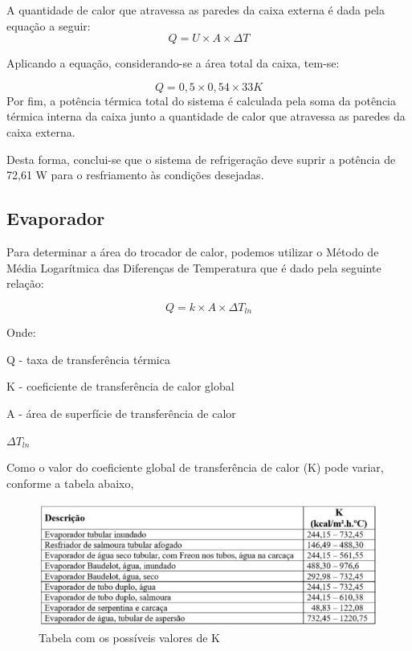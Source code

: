 	A quantidade de calor que atravessa as paredes da caixa externa é dada pela equação a seguir:
	\begin{equation}
	Q = U \times A \times \Delta T
	\end{equation}
	
	Aplicando a equação, considerando-se a área total da caixa, tem-se:
	
	$$
	Q = 0,5 \times 0,54 \times 33K
	$$
	Por fim, a potência térmica total do sistema é calculada pela soma da potência térmica interna da caixa junto a quantidade de calor que atravessa as paredes da caixa externa.
	
	Desta forma, conclui-se que o sistema de refrigeração deve suprir a potência de 72,61 W para o resfriamento às condições desejadas.
	
	\subsection{Evaporador}
	Para determinar a área do trocador de calor, podemos utilizar o Método de  Média Logarítmica das Diferenças de Temperatura que é dado pela seguinte relação:
	
	\begin{equation}
	Q = k \times A \times \Delta T_{ln}
	\end{equation}
	
	Onde:
	
	Q - taxa de transferência térmica 
	
	K - coeficiente de transferência de calor global
	
	A - área de superfície de transferência de calor
	
	$\Delta T_{ln}$
	
	
Como o valor do coeficiente global de transferência de calor (K) pode variar, conforme a tabela abaixo,
	\begin{figure}[H]
	\begin{center}
	\includegraphics[scale =1]{figuras/Tabela_K}
	\caption{Tabela com os possíveis valores de K}
	\end{center}
	\end{figure}
	
